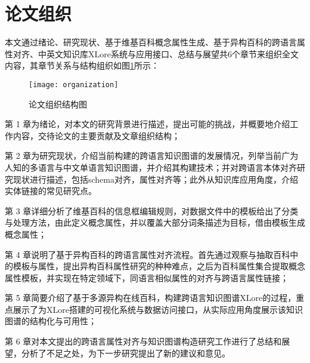 \section{论文组织}

本文通过绪论、研究现状、基于维基百科概念属性生成、基于异构百科的跨语言属性对齐、中英文知识库XLore系统与应用接口、总结与展望共6个章节来组织全文内容，其章节关系与结构组织如图\ref{fig:organization}所示：

\begin{figure}[H] %
  \centering
  \texttt{[image: organization]}
  \caption{论文组织结构图}
  \label{fig:organization}
\end{figure}

第 1 章为绪论，对本文的研究背景进行描述，提出可能的挑战，并概要地介绍工作内容，交待论文的主要贡献及文章组织结构；

第 2 章为研究现状，介绍当前构建的跨语言知识图谱的发展情况，列举当前广为人知的多语言与中文单语言知识图谱，并介绍其构建技术；并对跨语言本体对齐研究现状进行描述，包括schema对齐，属性对齐等；此外从知识库应用角度，介绍实体链接的常见研究点。

第 3 章详细分析了维基百科的信息框编辑规则，对数据文件中的模板给出了分类与处理方法，由此定义概念属性，并以覆盖大部分词条描述为目标，借由模板生成概念属性；

第 4 章说明了基于异构百科的跨语言属性对齐流程。首先通过观察与抽取百科中的模板与属性，提出异构百科属性研究的种种难点，之后为百科属性集合提取概念属性模板，并实现在特定领域下，同语言相似属性的对齐与跨语言属性链接；

第 5 章简要介绍了基于多源异构在线百科，构建跨语言知识图谱XLore的过程，重点展示了为XLore搭建的可视化系统与数据访问接口，从实际应用角度展示该知识图谱的结构化与可用性；

第 6 章对本文提出的跨语言属性对齐与知识图谱构造研究工作进行了总结和展望，分析了不足之处，为下一步研究提出了新的建议和意见。
 
